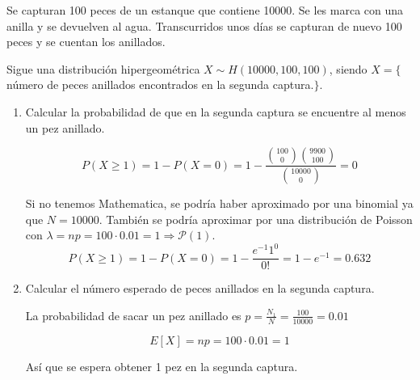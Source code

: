 \begin{ejer}
Se capturan 100 peces de un estanque que contiene 10000. Se les marca con una anilla y se devuelven al agua. Transcurridos unos días se capturan de nuevo 100 peces y se cuentan los anillados.

\end{ejer}
\begin{sol}
Sigue una distribución hipergeométrica  $X \sim H(10000, 100, 100)$, siendo $X=\{$número de peces anillados encontrados en la segunda captura.$\}$.

\begin{enumerate}

\item Calcular la probabilidad de que en la segunda captura se encuentre al menos un pez anillado.

\[
P(X\geq 1)=1 - P(X=0) =  1 - \frac{\binom{100}{0}\binom{9900}{100}}{\binom{10000}{0}}=0
\]

\begin{nota}
Si no tenemos Mathematica, se podría haber aproximado por una binomial ya que $N=10000$. También se podría aproximar por una distribución de Poisson con $\lambda=np=100\cdot  0.01=1\Longrightarrow \mathcal{P}(1)$.
\[
P(X\geq 1)= 1-P(X=0)=1-\frac{e^{-1}1^0}{0!}=1-e^{-1}=0.632
\]
\end{nota}

\item Calcular el número esperado de peces anillados en la segunda captura.

La probabilidad de sacar un pez anillado es $p=\frac{N_1}{N}=\frac{100}{10000}=0.01$

\[
E[X]=np=100\cdot 0.01=1
\]

Así que se espera obtener 1 pez en la segunda captura.

\end{enumerate}
\end{sol}

